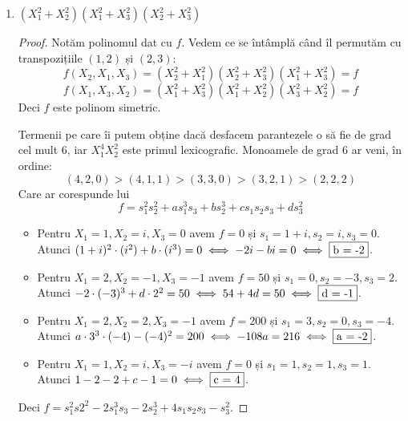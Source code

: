 \begin{exercise}[4.19]
\begin{enumerate}
\begin{proof}
    Deci \(f = s_1^2 s_2 - 2 s_2^2 - s_1 s_3\).
    \end{proof}
    
    \item \((X_1^2 + X_2^2)(X_1^2 + X_3^2)(X_2^2 + X_3^2)\)
    \begin{proof}
    Notăm polinomul dat cu \(f\). Vedem ce se întâmplă când îl permutăm cu transpozițiile \((1, 2)\) și \((2, 3)\):
    \[
    f(X_2, X_1, X_3) = (X_2^2 + X_1^2)(X_2^2 + X_3^2)(X_1^2 + X_3^2) = f
    \]
    \[
    f(X_1, X_3, X_2) = (X_1^2 + X_3^2)(X_1^2 + X_2^2)(X_3^2 + X_2^2) = f
    \]
    Deci \(f\) este polinom simetric.
    
    Termenii pe care îi putem obține dacă desfacem parantezele o să fie de grad cel mult 6, iar \(X_1^4 X_2^2\) este primul lexicografic. Monoamele de grad 6 ar veni, în ordine:
    \[
    (4, 2, 0) > (4, 1, 1) > (3, 3, 0) > (3, 2, 1) > (2, 2, 2)
    \]
    Care ar corespunde lui
    \[
    f = s_1^2 s_2^2 + a s_1^3 s_3 + b s_2^3 + c s_1 s_2 s_3 + d s_3^2
    \]
    
    \begin{itemize}
        \item Pentru \(X_1 = 1, X_2 = i, X_3 = 0\) avem \(f = 0\) și \(s_1 = 1 + i, s_2 = i, s_3 = 0\).
        Atunci \((1 + i)^2 \cdot (i^2) + b \cdot (i^3) = 0 \iff - 2i - bi = 0 \iff \fbox{b = -2}\).
        \item Pentru \(X_1 = 2, X_2 = -1, X_3 = -1\) avem \(f = 50\) și \(s_1 = 0, s_2 = -3, s_3 = 2\).
        Atunci \(-2 \cdot (-3)^3 + d \cdot 2^2 = 50 \iff 54 + 4d = 50 \iff \fbox{d = -1}\).
        \item Pentru \(X_1 = 2, X_2 = 2, X_3 = -1\) avem \(f = 200\) și \(s_1 = 3, s_2 = 0, s_3 = -4\).
        Atunci \(a \cdot 3^3 \cdot (-4) - (-4)^2 = 200 \iff -108 a = 216 \iff \fbox{a = -2}\).
        \item Pentru \(X_1 = 1, X_2 = i, X_3 = -i\) avem \(f = 0\) și \(s_1 = 1, s_2 = 1, s_3 = 1\).
        Atunci \(1 - 2 - 2 + c - 1 = 0 \iff \fbox{c = 4}\).
    \end{itemize}

    Deci \(f = s_1^2 s2^2 - 2s_1^3 s_3 - 2 s_2^3 + 4 s_1 s_2 s_3 - s_3^2\).
    \end{proof}
\end{enumerate}
\end{exercise}

